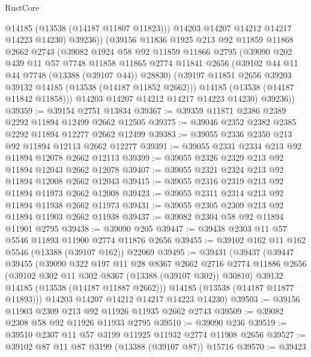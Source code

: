 \begin{lexlean}{RustCore}
\begin{coremodule}
              @14185
              (@13538 (@14187 @11807 @11823)))
            @14203
            @14207
            @14212
            @14217
            @14223
            @14230)
          @39236))
      (@39156
        @11836
        @1925
        @213
        @92
        @11859
        @11868
        @2662
        @2743
        (@39082
          @1924
          @58
          @92
          @11859
          @11866
          @2795
          (@39090
            @202
            @439
            @11
            @57
            @7748
            @11858
            @11865
            @2774
            @11841
            @2656
            (@39102 @44 @11 @44 @7748 (@13388 (@39107 @44)) @28830)
            (@39197 @11851 @2656 @39203 @39132 @14185 (@13538 (@14187 @11852 @2662)))
            @14185
            (@13538 (@14187 @11842 @11858)))
          @14203
          @14207
          @14212
          @14217
          @14223
          @14230)
        @39236))
@39359 := @39154 @2751 @13834
@39367 := @39359 @11871 @2386 @2389 @2292 @11894 @12499 @2662 @12505
@39375 := @39046 @2352 @2382 @2385 @2292 @11894 @12277 @2662 @12499
@39383 := @39055 @2336 @2350 @213 @92 @11894 @12113 @2662 @12277
@39391 := @39055 @2331 @2334 @213 @92 @11894 @12078 @2662 @12113
@39399 := @39055 @2326 @2329 @213 @92 @11894 @12043 @2662 @12078
@39407 := @39055 @2321 @2324 @213 @92 @11894 @12008 @2662 @12043
@39415 := @39055 @2316 @2319 @213 @92 @11894 @11973 @2662 @12008
@39423 := @39055 @2311 @2314 @213 @92 @11894 @11938 @2662 @11973
@39431 := @39055 @2305 @2309 @213 @92 @11894 @11903 @2662 @11938
@39437 := @39082 @2304 @58 @92 @11894 @11901 @2795
@39438 := @39090 @205
@39447 := @39438 @2303 @11 @57 @5546 @11893 @11900 @2774 @11876 @2656
@39455 := @39102 @162 @11 @162 @5546 (@13388 (@39107 @162)) @22069
@39495 := @39431
    (@39437
      (@39447
        @39455
        (@39090
          @322
          @197
          @11
          @28
          @8367
          @2662
          @2716
          @2774
          @11886
          @2656
          (@39102 @302 @11 @302 @8367 (@13388 (@39107 @302)) @30810)
          @39132
          @14185
          (@13538 (@14187 @11887 @2662)))
        @14185
        (@13538 (@14187 @11877 @11893)))
      @14203
      @14207
      @14212
      @14217
      @14223
      @14230)
@39503 := @39156 @11903 @2309 @213 @92 @11926 @11935 @2662 @2743
@39509 := @39082 @2308 @58 @92 @11926 @11933 @2795
@39510 := @39090 @236
@39519 := @39510 @2307 @11 @57 @3199 @11925 @11932 @2774 @11908 @2656
@39527 := @39102 @87 @11 @87 @3199 (@13388 (@39107 @87)) @15716
@39570 := @39423

\end{coremodule}
\end{lexlean}
